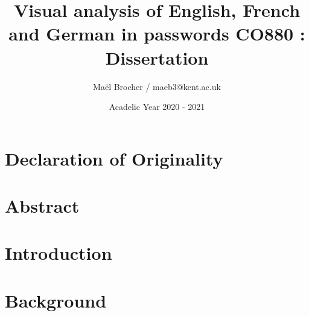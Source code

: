 \documentclass{article}
\title{Visual analysis of English, French and German in passwords CO880 : Dissertation}
\author{Maël Brocher / maeb3@kent.ac.uk}
\date{Acadelic Year 2020 - 2021}
\begin{document}
\maketitle

\newpage
\section*{Declaration of Originality}
\newpage

\section*{Abstract}

\newpage
\tableofcontents
\newpage


\section{Introduction}


\section{Background}



\end{document}
